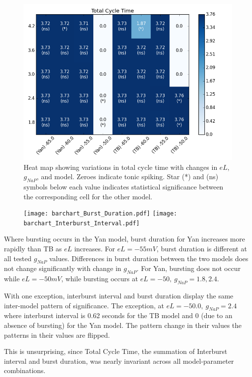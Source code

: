 \documentclass[11pt]{article}
\begin{document}
\begin{figure}[h]
	\includegraphics[scale=.4]{heatmap_Total_Cycle_Time.png}
	\caption{Heat map showing variations in total cycle time with changes in $eL$, $g_{NaP}$, and model. Zeroes indicate tonic spiking. Star (*) and (ns) symbols below each value indicates statistical significance between the corresponding cell for the other model.}
	\label{fig:hmTCT}
\end{figure}
 \begin{figure}[h]
	\centering
	\texttt{[image: barchart\_Burst\_Duration.pdf]}
	\texttt{[image: barchart\_Interburst\_Interval.pdf]}
	\caption{}
	\label{fig:bcBD}
\end{figure}
   


Where bursting occurs in the Yan model, burst duration for Yan increases more rapidly than TB as $eL$ increases. For $eL=-55 mV$, burst duration is different at all tested $g_{NaP}$ values.
Differences in burst duration between the two models does not change significantly with change in $g_{NaP}$. For Yan, bursting does not occur while $eL = -50 mV$, while bursting occurs at $eL=-50,\  g_{NaP}=1.8, 2.4$. 

With one exception, interburst interval and burst duration display the same inter-model pattern of significance. The exception, at $eL=-50.0,\ g_{NaP} = 2.4$ where interburst interval is 0.62 seconds for the TB model and 0 (due to an absence of bursting) for the Yan model. 
The pattern change in their values 
the patterns in their values are flipped.

This is unsurprising, since Total Cycle Time, the summation of Interburst interval and burst duration, was nearly invariant across all model-parameter combinations. 
\end{document}
